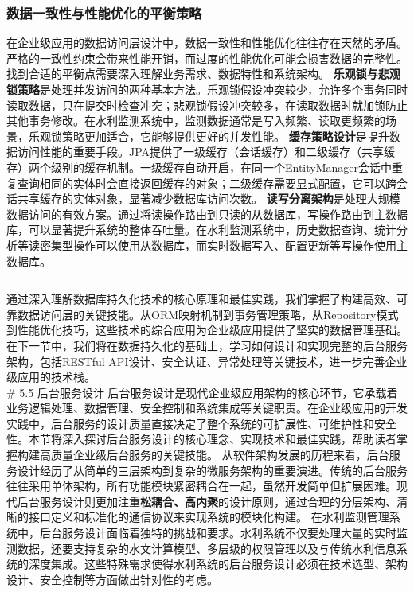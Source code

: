 \subsubsection{数据一致性与性能优化的平衡策略}\label{ux6570ux636eux4e00ux81f4ux6027ux4e0eux6027ux80fdux4f18ux5316ux7684ux5e73ux8861ux7b56ux7565}
在企业级应用的数据访问层设计中，数据一致性和性能优化往往存在天然的矛盾。严格的一致性约束会带来性能开销，而过度的性能优化可能会损害数据的完整性。找到合适的平衡点需要深入理解业务需求、数据特性和系统架构。
\textbf{乐观锁与悲观锁策略}是处理并发访问的两种基本方法。乐观锁假设冲突较少，允许多个事务同时读取数据，只在提交时检查冲突；悲观锁假设冲突较多，在读取数据时就加锁防止其他事务修改。在水利监测系统中，监测数据通常是写入频繁、读取更频繁的场景，乐观锁策略更加适合，它能够提供更好的并发性能。
\textbf{缓存策略设计}是提升数据访问性能的重要手段。JPA提供了一级缓存（会话缓存）和二级缓存（共享缓存）两个级别的缓存机制。一级缓存自动开启，在同一个EntityManager会话中重复查询相同的实体时会直接返回缓存的对象；二级缓存需要显式配置，它可以跨会话共享缓存的实体对象，显著减少数据库访问次数。
\textbf{读写分离架构}是处理大规模数据访问的有效方案。通过将读操作路由到只读的从数据库，写操作路由到主数据库，可以显著提升系统的整体吞吐量。在水利监测系统中，历史数据查询、统计分析等读密集型操作可以使用从数据库，而实时数据写入、配置更新等写操作使用主数据库。
\begin{lstlisting}[language=Java] \end{lstlisting}
通过深入理解数据库持久化技术的核心原理和最佳实践，我们掌握了构建高效、可靠数据访问层的关键技能。从ORM映射机制到事务管理策略，从Repository模式到性能优化技巧，这些技术的综合应用为企业级应用提供了坚实的数据管理基础。在下一节中，我们将在数据持久化的基础上，学习如何设计和实现完整的后台服务架构，包括RESTful
API设计、安全认证、异常处理等关键技术，进一步完善企业级应用的技术栈。 \\\# 5.5 后台服务设计
后台服务设计是现代企业级应用架构的核心环节，它承载着业务逻辑处理、数据管理、安全控制和系统集成等关键职责。在企业级应用的开发实践中，后台服务的设计质量直接决定了整个系统的可扩展性、可维护性和安全性。本节将深入探讨后台服务设计的核心理念、实现技术和最佳实践，帮助读者掌握构建高质量企业级后台服务的关键技能。
从软件架构发展的历程来看，后台服务设计经历了从简单的三层架构到复杂的微服务架构的重要演进。传统的后台服务往往采用单体架构，所有功能模块紧密耦合在一起，虽然开发简单但扩展困难。现代后台服务设计则更加注重\textbf{松耦合、高内聚}的设计原则，通过合理的分层架构、清晰的接口定义和标准化的通信协议来实现系统的模块化构建。
在水利监测管理系统中，后台服务设计面临着独特的挑战和要求。水利系统不仅要处理大量的实时监测数据，还要支持复杂的水文计算模型、多层级的权限管理以及与传统水利信息系统的深度集成。这些特殊需求使得水利系统的后台服务设计必须在技术选型、架构设计、安全控制等方面做出针对性的考虑。
